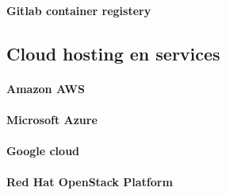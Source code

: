 \paragraph{Gitlab container registery}


\subsection{Cloud hosting en services}
\paragraph{Amazon AWS}
\paragraph{Microsoft Azure}
\paragraph{Google cloud}
\paragraph{Red Hat OpenStack Platform}



